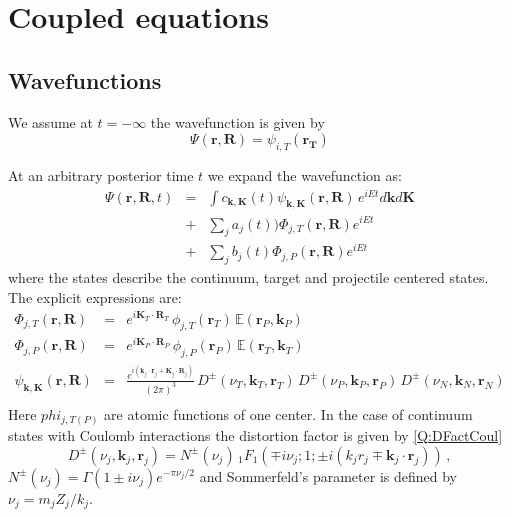 
% 

\chapter{Coupled equations}
\section{Wavefunctions}

We assume at $t=-\infty$ the wavefunction is given by
\[
\Psi(\mathbf{r},\mathbf{R}) = \psi_{i,T} (\mathbf{r_{T}})
\]

At an arbitrary posterior time $t$ we expand the wavefunction as:
\begin{eqnarray}
\Psi(\mathbf{r},\mathbf{R},t) &=&
  \int c_{\mathbf{k},\mathbf{K}}(t) \psi_{\mathbf{k},\mathbf{K}}(\mathbf{r},\mathbf{R})\,
  e^{i E t}  d \mathbf{k} d \mathbf{K}  \\
&+& \sum_{j} a_{j}(t)) \Phi_{j,T}(\mathbf{r},\mathbf{R}) e^{i E t}
\nonumber \\
&+& \sum_{j}  b_{j}(t) \Phi_{j,P}(\mathbf{r},\mathbf{R}) e^{i E t}
\nonumber
\end{eqnarray}
%
where the states describe the continuum, target and projectile centered
states. The explicit expressions are:
\begin{eqnarray}\label{Q:CE-fi-T}
  \Phi_{j,T}(\mathbf{r},\mathbf{R}) &=& e^{i \mathbf{K}_{T} \cdot \mathbf{R}_{T}} \,
  \phi_{j,T}(\mathbf{r}_{T}) \,  \mathbb{E}(\mathbf{r}_{P},\mathbf{k}_{P})
  \\
  \Phi_{j,P}(\mathbf{r},\mathbf{R}) &=& e^{i \mathbf{K}_{P} \cdot \mathbf{R}_{P}} \,
  \phi_{j,P}(\mathbf{r}_{P}) \,  \mathbb{E}(\mathbf{r}_{T},\mathbf{k}_{T})
  \\
  \psi_{\mathbf{k},\mathbf{K}}(\mathbf{r},\mathbf{R}) &=& \frac{e^{i
(\mathbf{k}_j\cdot \mathbf{r}_j+\mathbf{K}_j\cdot \mathbf{R}_j)}}{(2
\pi)^3} \,
 D^{\pm}(\nu_T,\mathbf{k}_T,\mathbf{r}_T) \, D^{\pm}(\nu_P,\mathbf{k}_P,\mathbf{r}_P)
 \,D^{\pm}(\nu_N,\mathbf{k}_N,\mathbf{r}_N) \nonumber \\
\end{eqnarray}
Here $phi_{j,T(P)}$ are atomic functions of one center. In the case of
continuum states with Coulomb interactions the distortion factor is
given by \ref{Q:DFactCoul}
%
\[
D^{\pm}(\nu_j,\mathbf{k}_{j},\mathbf{r}_{j})= N^{\pm}(\nu_{j}) \,{_1F_1}\left(
\mp i \nu_{j};1; {\pm} i (k_{j} r_{j} \mp \mathbf{k}_{j}
\cdot\mathbf{r}_{j} ) \right) \, ,
\]
%
$N^{\pm}(\nu_j)= \Gamma(1 {\pm} i\nu_j) e^{-\pi \nu_j/2}$ and Sommerfeld's
parameter is defined by $\nu_j = m_j Z_j/ k_j$.

